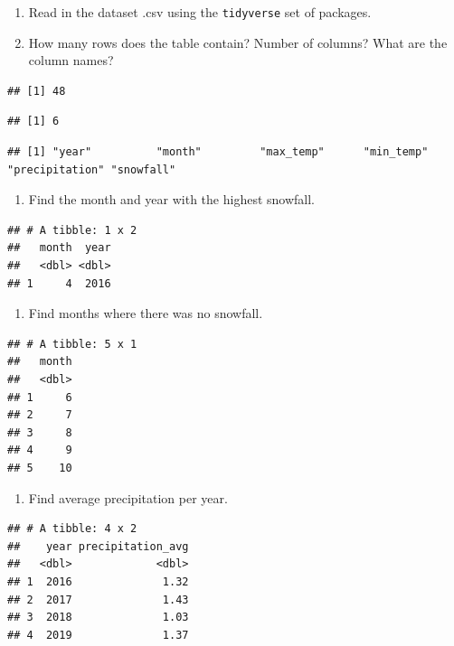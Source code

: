 \documentclass[
]{book}
\providecommand{\tightlist}{%
  \setlength{\itemsep}{0pt}\setlength{\parskip}{0pt}}
\begin{document}
\begin{enumerate}
\def\labelenumi{\arabic{enumi}.}
\setcounter{enumi}{1}
\item
  Read in the dataset .csv using the \texttt{tidyverse} set of packages.
\item
  How many rows does the table contain? Number of columns? What are the column names?
\end{enumerate}

\begin{verbatim}
## [1] 48
\end{verbatim}

\begin{verbatim}
## [1] 6
\end{verbatim}

\begin{verbatim}
## [1] "year"          "month"         "max_temp"      "min_temp"      "precipitation" "snowfall"
\end{verbatim}

\begin{enumerate}
\def\labelenumi{\arabic{enumi}.}
\setcounter{enumi}{3}
\tightlist
\item
  Find the month and year with the highest snowfall.
\end{enumerate}

\begin{verbatim}
## # A tibble: 1 x 2
##   month  year
##   <dbl> <dbl>
## 1     4  2016
\end{verbatim}

\begin{enumerate}
\def\labelenumi{\arabic{enumi}.}
\setcounter{enumi}{4}
\tightlist
\item
  Find months where there was no snowfall.
\end{enumerate}

\begin{verbatim}
## # A tibble: 5 x 1
##   month
##   <dbl>
## 1     6
## 2     7
## 3     8
## 4     9
## 5    10
\end{verbatim}

\begin{enumerate}
\def\labelenumi{\arabic{enumi}.}
\setcounter{enumi}{5}
\tightlist
\item
  Find average precipitation per year.
\end{enumerate}

\begin{verbatim}
## # A tibble: 4 x 2
##    year precipitation_avg
##   <dbl>             <dbl>
## 1  2016              1.32
## 2  2017              1.43
## 3  2018              1.03
## 4  2019              1.37
\end{verbatim}
\end{document}
